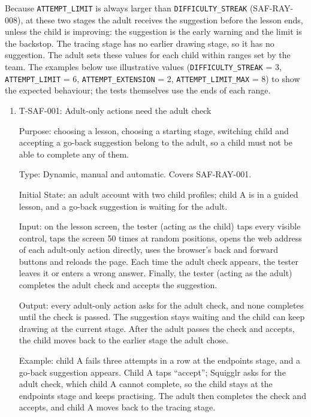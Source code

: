 \documentclass[12pt, titlepage]{article}
\newcommand{\testitem}[1]{\item #1\par\nopagebreak}
\begin{document}
Because \texttt{ATTEMPT\_LIMIT} is always larger than
\texttt{DIFFICULTY\_STREAK} (SAF-RAY-008), at these two stages the adult receives
the suggestion before the lesson ends, unless the child is improving: the
suggestion is the early warning and the limit is the backstop. The tracing stage
has no earlier drawing stage, so it has no suggestion. The adult sets these values for each child within
ranges set by the team. The examples below use illustrative values
(\texttt{DIFFICULTY\_STREAK} = 3, \texttt{ATTEMPT\_LIMIT} = 6,
\texttt{ATTEMPT\_EXTENSION} = 2, \texttt{ATTEMPT\_LIMIT\_MAX} = 8) to show
the expected behaviour; the tests themselves use the ends of each range.

\begin{enumerate}

\testitem{T-SAF-001: Adult-only actions need the adult check}

Purpose: choosing a lesson, choosing a starting stage, switching child and
accepting a go-back suggestion belong to the adult, so a child must not be
able to complete any of them.

Type: Dynamic, manual and automatic. Covers SAF-RAY-001.

Initial State: an adult account with two child profiles; child A is in a
guided lesson, and a go-back suggestion is waiting for the adult.

Input: on the lesson screen, the tester (acting as the child) taps every
visible control, taps the screen 50 times at random positions, opens the
web address of each adult-only action directly, uses the browser's back
and forward buttons and reloads the page. Each time the adult check
appears, the tester leaves it or enters a wrong answer. Finally, the tester
(acting as the adult) completes the adult check and accepts the suggestion.

Output: every adult-only action asks for the adult check, and none completes
until the check is passed. The suggestion stays waiting and the child can
keep drawing at the current stage. After the adult passes the check and
accepts, the child moves back to the earlier stage the adult chose.

Example: child A fails three attempts in a row at the endpoints stage, and a
go-back suggestion appears. Child A taps ``accept''; Squigglr asks for the
adult check, which child A cannot complete, so the child stays at the
endpoints stage and keeps practising. The adult then completes the check and
accepts, and child A moves back to the tracing stage.


\end{enumerate}
\end{document}
